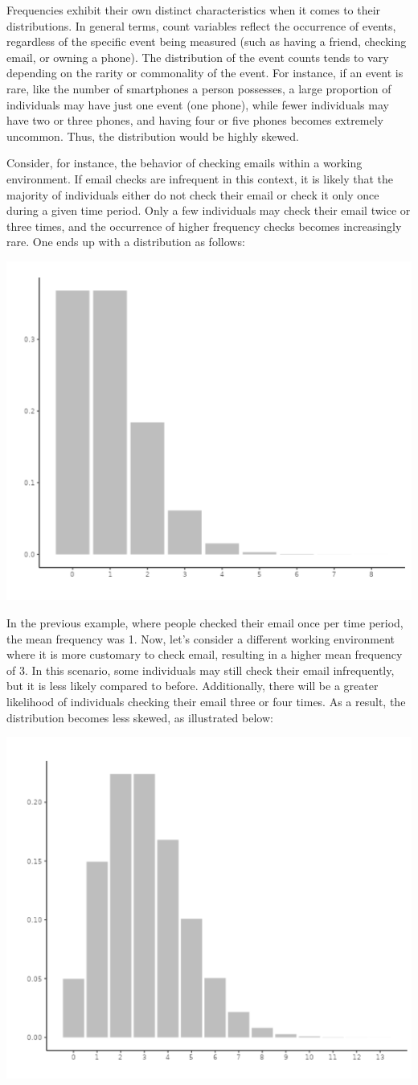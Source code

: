 \documentclass[
]{book}
\begin{document}
Frequencies exhibit their own distinct characteristics when it comes to their distributions. In general terms, count variables reflect the occurrence of events, regardless of the specific event being measured (such as having a friend, checking email, or owning a phone). The distribution of the event counts tends to vary depending on the rarity or commonality of the event. For instance, if an event is rare, like the number of smartphones a person possesses, a large proportion of individuals may have just one event (one phone), while fewer individuals may have two or three phones, and having four or five phones becomes extremely uncommon. Thus, the distribution would be highly skewed.

Consider, for instance, the behavior of checking emails within a working environment. If email checks are infrequent in this context, it is likely that the majority of individuals either do not check their email or check it only once during a given time period. Only a few individuals may check their email twice or three times, and the occurrence of higher frequency checks becomes increasingly rare. One ends up with a distribution as follows:

\includegraphics[width=0.6\linewidth]{bookletpics/3_poisson_theory1}

In the previous example, where people checked their email once per time period, the mean frequency was 1. Now, let's consider a different working environment where it is more customary to check email, resulting in a higher mean frequency of 3. In this scenario, some individuals may still check their email infrequently, but it is less likely compared to before. Additionally, there will be a greater likelihood of individuals checking their email three or four times. As a result, the distribution becomes less skewed, as illustrated below:

\includegraphics[width=0.6\linewidth]{bookletpics/3_poisson_theory2}
\end{document}
